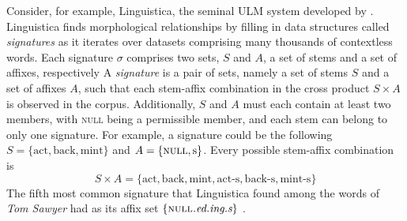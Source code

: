 Consider, for example, Linguistica, the seminal 
\ac{ULM}  system developed by \cite{goldsmith:2001, goldsmith:2006}. 
Linguistica finds morphological relationships by filling in 
data structures 
called \emph{signatures} as it iterates over datasets comprising many
thousands of contextless words. Each signature $\sigma$ 
comprises 
two sets, $S$ and $A$, a set of stems and a set of affixes, 
respectively %
A \emph{signature} is a pair of sets, namely a set of stems $S$ and 
a set of affixes $A$, such that each stem-affix combination in the cross 
product $S \times A$ is observed in the corpus. Additionally, $S$ and 
$A$ must each contain at least two members, with \textsc{null} being 
a permissible member, and each stem can belong to only one signature.  
For example, a signature could be the following $S = \{ \text{act}, \text{back}, \text{mint} \}$ 
and $A = \{ \textsc{null}, \text{s}\}$. Every possible stem-affix combination is 
\begin{equation}
\label{eq:SxA}
S \times A = \{ \text{act}, \text{back}, \text{mint}, \text{act-s}, 
\text{back-s}, \text{mint-s}\}
\end{equation}
The fifth 
most common signature that Linguistica found among the words of 
\textit{Tom Sawyer} had as its affix set $\{\textsc{null}\textit{.ed.ing.s}\}$  \cite{goldsmith:2001}. 
